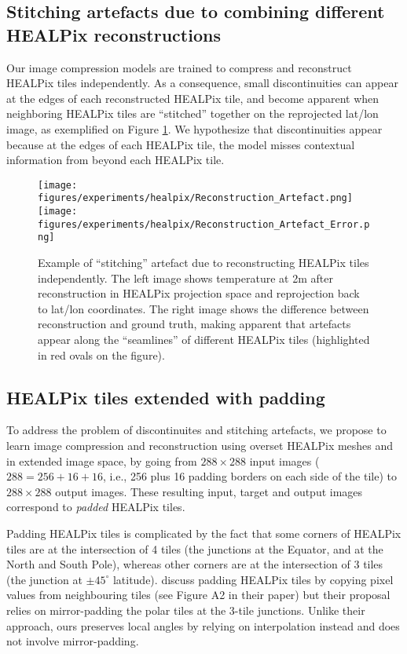 \documentclass[11pt, a4paper, logo, copyright, numbering]{googledeepmind}
\begin{document}
\subsection{Stitching artefacts due to combining different HEALPix reconstructions}

Our image compression models are trained to compress and reconstruct HEALPix tiles independently. As a consequence, small discontinuities can appear at the edges of each reconstructed HEALPix tile, and become apparent when neighboring HEALPix tiles are ``stitched'' together on the reprojected lat/lon image, as exemplified on Figure \ref{fig:stitching}. We hypothesize that discontinuities appear because at the edges of each HEALPix tile, the model misses contextual information from beyond each HEALPix tile.

\begin{figure}
    \centering
    \texttt{[image: figures/experiments/healpix/Reconstruction\_Artefact.png]}
    \texttt{[image: figures/experiments/healpix/Reconstruction\_Artefact\_Error.png]}
    \hfill
    \caption{Example of ``stitching'' artefact due to reconstructing HEALPix tiles independently. The left image shows temperature at 2m after reconstruction in HEALPix projection space and reprojection back to lat/lon coordinates. The right image shows the difference between reconstruction and ground truth, making apparent that artefacts appear along the ``seamlines'' of different HEALPix tiles (highlighted in red ovals on the figure).}
    \label{fig:stitching}
\end{figure}

\subsection{HEALPix tiles extended with padding}

To address the problem of discontinuites and stitching artefacts, we propose to learn image compression and reconstruction using overset HEALPix meshes and in extended image space, by going from $288 \times 288$ input images ($288 = 256 + 16 + 16$, i.e., 256 plus 16 padding borders on each side of the tile) to $288 \times 288$ output images. These resulting input, target and output images correspond to \emph{padded} HEALPix tiles.

Padding HEALPix tiles is complicated by the fact that some corners of HEALPix tiles are at the intersection of 4 tiles (the junctions at the Equator, and at the North and South Pole), whereas other corners are at the intersection of 3 tiles (the junction at $\pm 45^\circ$ latitude). \citet{karlbauer2023advancing} discuss padding HEALPix tiles by copying pixel values from neighbouring tiles (see Figure A2 in their paper) but their proposal relies on mirror-padding the polar tiles at the 3-tile junctions. Unlike their approach, ours preserves local angles by relying on interpolation instead and does not involve mirror-padding.
\end{document}
